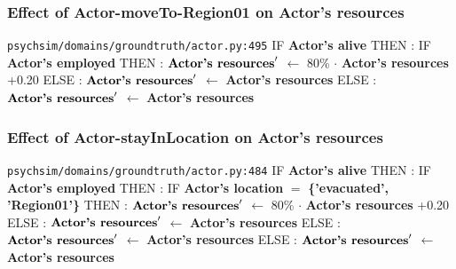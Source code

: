 \documentclass{article}%
\begin{document}
\subsubsection{Effect of Actor{-}moveTo{-}Region01 on Actor's resources}%
\label{ssubsec:Effect of Actor{-}moveTo{-}Region01 on Actor's resources}%
\begin{flushleft}%
\verb|psychsim/domains/groundtruth/actor.py:495|%
\linebreak%
IF %
\textbf{Actor's alive}%
\linebreak%
\hspace*{2em}%
THEN %
: %
IF %
\textbf{Actor's employed}%
\linebreak%
\hspace*{4em}%
THEN %
: %
$\mbox{\textbf{Actor's resources}} '$%
$\leftarrow$%
80\%%
$\cdot$%
\textbf{Actor's resources}%
+0.20%
\linebreak%
\hspace*{4em}%
ELSE %
: %
$\mbox{\textbf{Actor's resources}} '$%
$\leftarrow$%
\textbf{Actor's resources}%
\linebreak%
\hspace*{2em}%
ELSE %
: %
$\mbox{\textbf{Actor's resources}} '$%
$\leftarrow$%
\textbf{Actor's resources}%
\end{flushleft}

%
\subsubsection{Effect of Actor{-}stayInLocation on Actor's resources}%
\label{ssubsec:Effect of Actor{-}stayInLocation on Actor's resources}%
\begin{flushleft}%
\verb|psychsim/domains/groundtruth/actor.py:484|%
\linebreak%
IF %
\textbf{Actor's alive}%
\linebreak%
\hspace*{2em}%
THEN %
: %
IF %
\textbf{Actor's employed}%
\linebreak%
\hspace*{4em}%
THEN %
: %
IF %
\textbf{Actor's location}%
$=$%
\textbf{\{'evacuated', 'Region01'\}}%
\linebreak%
\hspace*{6em}%
THEN %
: %
$\mbox{\textbf{Actor's resources}} '$%
$\leftarrow$%
80\%%
$\cdot$%
\textbf{Actor's resources}%
+0.20%
\linebreak%
\hspace*{6em}%
ELSE %
: %
$\mbox{\textbf{Actor's resources}} '$%
$\leftarrow$%
\textbf{Actor's resources}%
\linebreak%
\hspace*{4em}%
ELSE %
: %
$\mbox{\textbf{Actor's resources}} '$%
$\leftarrow$%
\textbf{Actor's resources}%
\linebreak%
\hspace*{2em}%
ELSE %
: %
$\mbox{\textbf{Actor's resources}} '$%
$\leftarrow$%
\textbf{Actor's resources}%
\end{flushleft}
\end{document}
